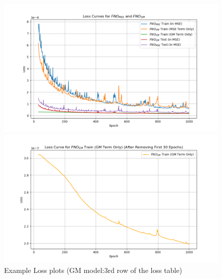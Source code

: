 \documentclass[
]{article}
\begin{document}
\begin{figure}

\begin{minipage}{0.50\linewidth}

\includegraphics[width=1\textwidth,height=\textheight]{../../test/all_loss.png}

\end{minipage}%
%
\begin{minipage}{0.50\linewidth}

\includegraphics[width=1\textwidth,height=\textheight]{../../test/GM_term.png}

\end{minipage}%

\caption{\label{fig-loss}Example Loss plots (GM model:3rd row of the
loss table)}

\end{figure}%
\end{document}
